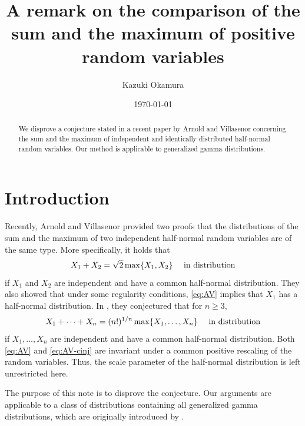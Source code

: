 \documentclass[a4paper, reqno, 11pt]{amsart}
\theoremstyle{definition}
\begin{document}
\begin{abstract}
We disprove a conjecture stated in a recent paper by Arnold and Villasenor concerning the sum and the maximum of independent and identically distributed half-normal random variables. 
Our method is applicable to generalized gamma distributions. 
\end{abstract}

\title[]{A remark on the comparison of the sum and the maximum of positive random variables}
\author{Kazuki Okamura}
\date{\today}
\address{Department of Mathematics, Faculty of Science, Shizuoka University, 836, Ohya, Suruga-ku, Shizuoka, 422-8529, JAPAN.}
\maketitle


\section{Introduction}

Recently, Arnold and Villasenor \cite{AV2026} provided two proofs that the distributions of the sum and the maximum of two independent half-normal random variables are of the same type. 
More specifically, 
it holds that 
\begin{equation}\label{eq:AV}
X_1 + X_2 = \sqrt{2} \max\{X_1, X_2\} \quad \textup{ in distribution}
\end{equation}
if $X_1$ and $X_2$ are independent and have  a common half-normal distribution. 
They also showed that under some regularity conditions, \eqref{eq:AV} implies that $X_1$ has a half-normal distribution. 
In \cite[Section 4]{AV2026}, they conjectured that for $n \ge 3$, 
\begin{equation}\label{eq:AV-cinj}
X_1 + \cdots + X_n = (n!)^{1/n} \max\{X_1, \dots, X_n\} \quad \textup{ in distribution}
\end{equation}
if $X_1, \dots, X_n$ are independent and have  a common half-normal distribution. 
Both \eqref{eq:AV} and \eqref{eq:AV-cinj} are invariant under a common positive rescaling of the random variables. 
Thus, the scale parameter of the half-normal distribution is left unrestricted here.

The purpose of this note is to disprove the conjecture. 
Our arguments are applicable to a class of distributions containing all generalized gamma distributions, which are originally introduced by \cite{Stacy1962}. 
\end{document}
